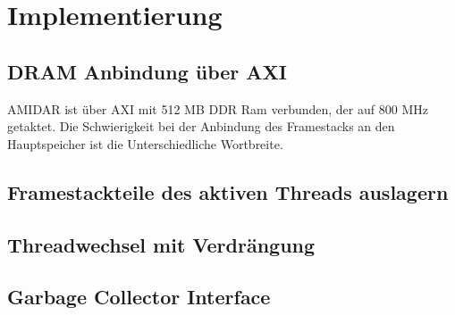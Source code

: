 \chapter{Implementierung}
\label{cha:Implementierung}
\section{DRAM Anbindung über AXI}
AMIDAR ist über AXI mit 512 MB DDR Ram verbunden, der auf 800 MHz getaktet.
Die Schwierigkeit bei der Anbindung des Framestacks an den Hauptspeicher ist die Unterschiedliche Wortbreite.  
\section{Framestackteile des aktiven Threads auslagern}
\section{Threadwechsel mit Verdrängung}
\section{Garbage Collector Interface}
